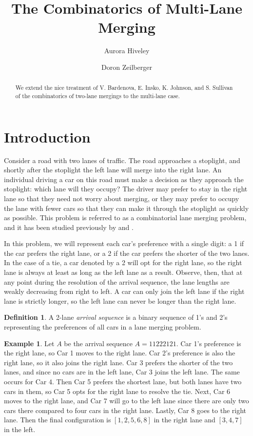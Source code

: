 \documentclass[article]{amsart}
\title{The Combinatorics of Multi-Lane Merging}
\author[Hiveley]{Aurora Hiveley}
\author[Zeilberger]{Doron Zeilberger}
\theoremstyle{plain}
\theoremstyle{definition}
\newtheorem{definition}{Definition}
\newtheorem{example}{Example}
\begin{document}
\begin{abstract}
We extend the nice treatment of V. Bardenova, E. Insko, K. Johnson, and S. Sullivan of the combinatorics of two-lane mergings to the multi-lane case.

\end{abstract}


\maketitle

\section{Introduction} \label{sec:intro}
Consider a road with two lanes of traffic. The road approaches a stoplight, and shortly after the stoplight the left lane will merge into the right lane. An individual driving a car on this road must make a decision as they approach the stoplight: which lane will they occupy? The driver may prefer to stay in the right lane so that they need not worry about merging, or they may prefer to occupy the lane with fewer cars so that they can make it through the stoplight as quickly as possible. This problem is referred to as a combinatorial lane merging problem, and it has been studied previously by \cite{bard} and \cite{insko}.

In this problem, we will represent each car's preference with a single digit: a 1 if the car prefers the right lane, or a 2 if the car prefers the shorter of the two lanes. In the case of a tie, a car denoted by a 2 will opt for the right lane, so the right lane is always at least as long as the left lane as a result. Observe, then, that at any point during the resolution of the arrival sequence, the lane lengths are weakly decreasing from right to left. A car can only join the left lane if the right lane is strictly longer, so the left lane can never be longer than the right lane. 

\begin{definition}
A 2-lane \textit{arrival sequence} is a binary sequence of 1's and 2's representing the preferences of all cars in a lane merging problem.
\end{definition}

\begin{example} \label{ex:arrseq}
Let $A$ be the arrival sequence $A = 11222121$. Car 1's preference is the right lane, so Car 1 moves to the right lane. Car 2's preference is also the right lane, so it also joins the right lane. Car 3 prefers the shorter of the two lanes, and since no cars are in the left lane, Car 3 joins the left lane. The same occurs for Car 4. Then Car 5 prefers the shortest lane, but both lanes have two cars in them, so Car 5 opts for the right lane to resolve the tie. Next, Car 6 moves to the right lane, and Car 7 will go to the left lane since there are only two cars there compared to four cars in the right lane. Lastly, Car 8 goes to the right lane. Then the final configuration is $[1,2,5,6,8]$ in the right lane and $[3,4,7]$ in the left.
\end{example}
\end{document}
